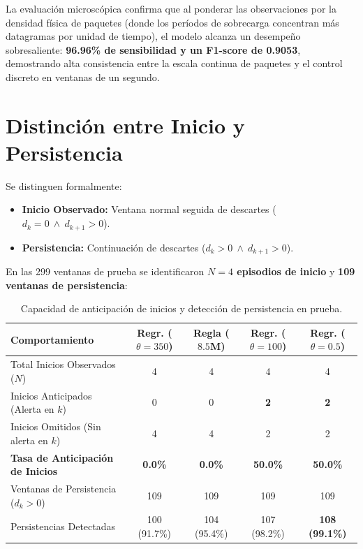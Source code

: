 \documentclass[11pt,a4paper]{article}
\begin{document}
La evaluación microscópica confirma que al ponderar las observaciones por la densidad física de paquetes (donde los períodos de sobrecarga concentran más datagramas por unidad de tiempo), el modelo alcanza un desempeño sobresaliente: \textbf{96.96\% de sensibilidad y un F1-score de 0.9053}, demostrando alta consistencia entre la escala continua de paquetes y el control discreto en ventanas de un segundo.

\section{Distinción entre Inicio y Persistencia}
\label{sec:inicios}

Se distinguen formalmente:
\begin{itemize}
    \item \textbf{Inicio Observado:} Ventana normal seguida de descartes ($d_k = 0 \ \wedge \ d_{k+1} > 0$).
    \item \textbf{Persistencia:} Continuación de descartes ($d_k > 0 \ \wedge \ d_{k+1} > 0$).
\end{itemize}

En las 299 ventanas de prueba se identificaron \textbf{$N = 4$ episodios de inicio} y \textbf{109 ventanas de persistencia}:

\begin{table}[H]
\centering
\footnotesize
\caption{Capacidad de anticipación de inicios y detección de persistencia en prueba.}
\label{tab:inicios_persistencia}
\begin{tabular}{lcccc}
\toprule
\textbf{Comportamiento} & \textbf{Regr. ($\theta=350$)} & \textbf{Regla ($8.5$M)} & \textbf{Regr. ($\theta=100$)} & \textbf{Regr. ($\theta=0.5$)} \\
\midrule
Total Inicios Observados ($N$) & 4 & 4 & 4 & 4 \\
Inicios Anticipados (Alerta en $k$) & 0 & 0 & \textbf{2} & \textbf{2} \\
Inicios Omitidos (Sin alerta en $k$) & 4 & 4 & 2 & 2 \\
\textbf{Tasa de Anticipación de Inicios} & \textbf{0.0\%} & \textbf{0.0\%} & \textbf{50.0\%} & \textbf{50.0\%} \\
\midrule
Ventanas de Persistencia ($d_k > 0$) & 109 & 109 & 109 & 109 \\
Persistencias Detectadas & 100 (91.7\%) & 104 (95.4\%) & 107 (98.2\%) & \textbf{108 (99.1\%)} \\
\bottomrule
\end{tabular}
\end{table}
\end{document}
